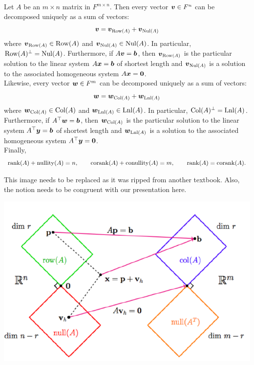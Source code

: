 \begin{Thm} Let $A$ be an $m\times n$ matrix in $F^{m\times n}$. Then every vector $\boldsymbol v\in F^n$ can be decomposed uniquely as a sum of vectors:
\[\boldsymbol v = \boldsymbol v_{\operatorname*{Row}(A)} + \boldsymbol v_{\operatorname{Nul}(A)}\] where $\boldsymbol v_{\operatorname*{Row}(A)}\in \operatorname*{Row}(A)$ and $\boldsymbol v_{\operatorname{Nul}(A)} \in \operatorname{Nul}(A)$. In particular, $\operatorname*{Row}(A)^\perp = \operatorname{Nul}(A)$. Furthermore, if $A\boldsymbol v = \boldsymbol b$, then $\boldsymbol v_{\operatorname*{Row}(A)}$ is the particular solution to the linear system $A\boldsymbol x=\boldsymbol b$ of shortest length and $\boldsymbol v_{\operatorname{Nul}(A)}$ is a solution to the associated homogeneous system $A\boldsymbol x = \boldsymbol 0$. \\

Likewise, every vector $\boldsymbol w\in F^m$ can be decomposed uniquely as a sum of vectors:
\[\boldsymbol w = \boldsymbol w_{\operatorname{Col}(A)} + \boldsymbol w_{\operatorname*{Lnl}(A)}\] where $\boldsymbol  w_{\operatorname{Col}(A)}\in \operatorname{Col}(A)$ and $\boldsymbol w_{\operatorname*{Lnl}(A)}\in \operatorname*{Lnl}(A)$. In particular, $\operatorname{Col}(A)^\perp = \operatorname*{Lnl}(A)$. Furthermore, if $A^\top\boldsymbol w = \boldsymbol b$, then $\boldsymbol w_{\operatorname{Col}(A)}$ is the particular solution to the linear system $A^\top\boldsymbol y=\boldsymbol b$ of shortest length and $\boldsymbol w_{\operatorname*{Lnl}(A)}$ is a solution to the associated homogeneous system $A^\top\boldsymbol y = \boldsymbol0$.\\

Finally, 
\[\operatorname*{rank}(A) + \operatorname*{nullity}(A) = n,\qquad \operatorname*{corank}(A) + \operatorname*{conullity}(A) = m,\qquad \operatorname*{rank}(A) = \operatorname*{corank}(A).\]
\end{Thm}

{\color{red} This image needs to be replaced as it was ripped from another textbook. Also, the notion needs to be congruent with our presentation here.}

\centerline{\includegraphics[scale=0.5]{Chapter4/images/ftla.png}}


